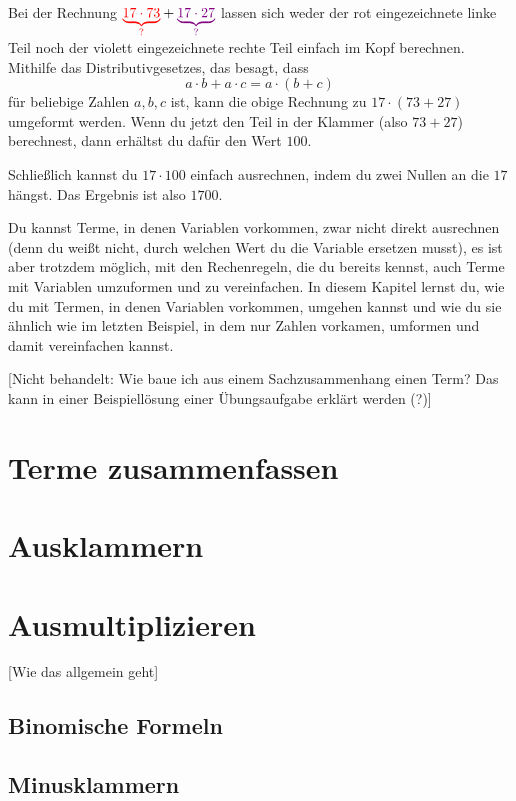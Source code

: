 \documentclass[../../main.tex]{subfiles}
\begin{document}
\begin{example}
    Bei der Rechnung $\textcolor{red}{\underbrace{17\cdot73}_?}+\textcolor{violet}{\underbrace{17\cdot 27}_?}$ lassen sich weder der rot eingezeichnete linke Teil noch der violett eingezeichnete rechte Teil einfach im Kopf berechnen. Mithilfe das Distributivgesetzes, das besagt, dass
    \[a\cdot b+a\cdot c=a\cdot (b+c)\]
    für beliebige Zahlen $a,b,c$ ist, kann die obige Rechnung zu $17\cdot (73+27)$ umgeformt werden. Wenn du jetzt den Teil in der Klammer (also $73+27$) berechnest, dann erhältst du dafür den Wert $100$.
    
    Schließlich kannst du $17\cdot 100$ einfach ausrechnen, indem du zwei Nullen an die $17$ hängst. Das Ergebnis ist also $1700$.
\end{example}

Du kannst Terme, in denen Variablen vorkommen, zwar nicht direkt ausrechnen (denn du weißt nicht, durch welchen Wert du die Variable ersetzen musst), es ist aber trotzdem möglich, mit den Rechenregeln, die du bereits kennst, auch Terme mit Variablen umzuformen und zu vereinfachen. In diesem Kapitel lernst du, wie du mit Termen, in denen Variablen vorkommen, umgehen kannst und wie du sie ähnlich wie im letzten Beispiel, in dem nur Zahlen vorkamen, umformen und damit vereinfachen kannst.

[Nicht behandelt: Wie baue ich aus einem Sachzusammenhang einen Term? Das kann in einer Beispiellösung einer Übungsaufgabe erklärt werden (?)]

\section{Terme zusammenfassen}
\section{Ausklammern}
\section{Ausmultiplizieren}

[Wie das allgemein geht]

\subsection{Binomische Formeln}
\subsection{Minusklammern}
\end{document}
